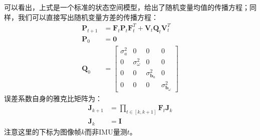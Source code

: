 可以看出，上式是一个标准的状态空间模型，给出了随机变量均值的传播方程；同样，我们可以直接写出随机变量方差的传播方程：
\begin{equation}
	\begin{aligned}
	\bm{P}_{t+1}&=\bm{F}_t\bm{P}_t\bm{F}_t^T+\bm{V}_t\bm{Q}_t\bm{V}_t^T\\
	\bm{P}_0&=\bm{0}\\
	\bm{Q}_0&=\left[\begin{matrix}
	\sigma_a^2 & 0 & 0 & 0\\
	0 & \sigma_\omega^2 & 0 & 0\\
	0 & 0 & \sigma_{\bm{b}_a}^2 & 0\\
	0 & 0 & 0 & \sigma_{\bm{b}_\omega}^2
	\end{matrix}\right]
	\end{aligned}
\end{equation}
误差系数自身的雅克比矩阵为：
\begin{equation}\begin{aligned}
\bm{J}_{k+1}&=\prod\limits_{t\in\left[k,k+1\right]}\bm{F}_t\bm{J}_k\\
\bm{J}_k&=\bm{I}
\end{aligned}
\end{equation}
注意这里的下标为图像帧$k$而非IMU量测$t$。
